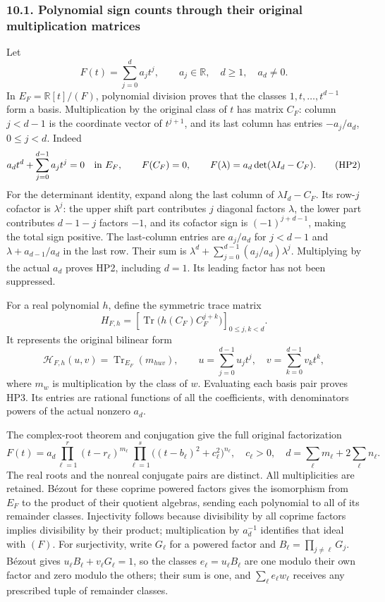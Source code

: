 \documentclass[
  11pt,
]{article}
\begin{document}
\subsubsection{10.1. Polynomial sign counts through their original
multiplication
matrices}\label{polynomial-sign-counts-through-their-original-multiplication-matrices}

Let \[
F(t)=\sum_{j=0}^{d}a_jt^j,\qquad a_j\in\mathbb R,\quad d\geq1,\quad a_d\ne0.
\tag{HP1}
\] In \(E_F=\mathbb R[t]/(F)\), polynomial division proves that the
classes \(1,t,\ldots,t^{d-1}\) form a basis. Multiplication by the
original class of \(t\) has matrix \(C_F\): column \(j<d-1\) is the
coordinate vector of \(t^{j+1}\), and its last column has entries
\(-a_j/a_d\), \(0\leq j<d\). Indeed \[
a_dt^d+\sum_{j=0}^{d-1}a_jt^j=0\quad\hbox{in }E_F,
\qquad F(C_F)=0,\qquad F(\lambda)=a_d\det(\lambda I_d-C_F).
\tag{HP2}
\] For the determinant identity, expand along the last column of
\(\lambda I_d-C_F\). Its row-\(j\) cofactor is \(\lambda^j\): the upper
shift part contributes \(j\) diagonal factors \(\lambda\), the lower
part contributes \(d-1-j\) factors \(-1\), and its cofactor sign is
\((-1)^{j+d-1}\), making the total sign positive. The last-column
entries are \(a_j/a_d\) for \(j<d-1\) and \(\lambda+a_{d-1}/a_d\) in the
last row. Their sum is \(\lambda^d+\sum_{j=0}^{d-1}(a_j/a_d)\lambda^j\).
Multiplying by the actual \(a_d\) proves HP2, including \(d=1\). Its
leading factor has not been suppressed.

For a real polynomial \(h\), define the symmetric trace matrix \[
H_{F,h}=\left[\operatorname{Tr}\big(h(C_F)C_F^{j+k}\big)\right]_{0\leq j,k<d}.
\tag{HP3}
\] It represents the original bilinear form \[
\mathcal H_{F,h}(u,v)=\operatorname{Tr}_{E_F}(m_{huv}),\qquad
u=\sum_{j=0}^{d-1}u_jt^j,\quad v=\sum_{k=0}^{d-1}v_kt^k,
\tag{HP4}
\] where \(m_w\) is multiplication by the class of \(w\). Evaluating
each basis pair proves HP3. Its entries are rational functions of all
the coefficients, with denominators powers of the actual nonzero
\(a_d\).

The complex-root theorem and conjugation give the full original
factorization \[
F(t)=a_d
\prod_{\ell=1}^{r}(t-r_\ell)^{m_\ell}
\prod_{\ell=1}^{s}\big((t-b_\ell)^2+c_\ell^2\big)^{n_\ell},
\quad c_\ell>0,\quad
d=\sum_\ell m_\ell+2\sum_\ell n_\ell.
\tag{HP5}
\] The real roots and the nonreal conjugate pairs are distinct. All
multiplicities are retained. Bézout for these coprime powered factors
gives the isomorphism from \(E_F\) to the product of their quotient
algebras, sending each polynomial to all of its remainder classes.
Injectivity follows because divisibility by all coprime factors implies
divisibility by their product; multiplication by \(a_d^{-1}\) identifies
that ideal with \((F)\). For surjectivity, write \(G_\ell\) for a
powered factor and \(B_\ell=\prod_{j\ne\ell}G_j\). Bézout gives
\(u_\ell B_\ell+v_\ell G_\ell=1\), so the classes
\(e_\ell=u_\ell B_\ell\) are one modulo their own factor and zero modulo
the others; their sum is one, and \(\sum_\ell e_\ell w_\ell\) receives
any prescribed tuple of remainder classes.
\end{document}
